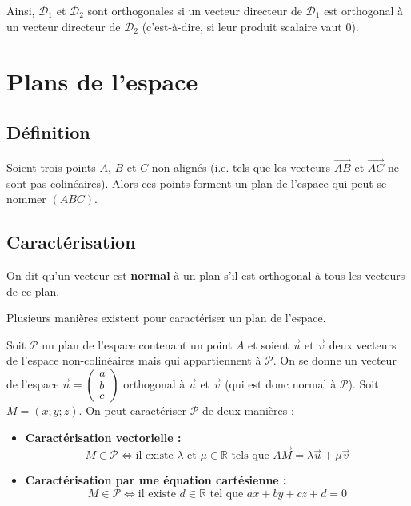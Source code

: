 	\begin{tip}
		Ainsi, $\mathcal{D}_1$ et $\mathcal{D}_2$ sont orthogonales si un vecteur directeur de $\mathcal{D}_1$ est orthogonal à un vecteur directeur de $\mathcal{D}_2$ (c'est-à-dire, si leur produit scalaire vaut $0$).
	\end{tip}

	\section{Plans de l'espace}

	\subsection{Définition}

	Soient trois points $A$, $B$ et $C$ non alignés (i.e. tels que les vecteurs $\overrightarrow{AB}$ et $\overrightarrow{AC}$ ne sont pas colinéaires). Alors ces points forment un plan de l'espace qui peut se nommer $(ABC)$.

	\subsection{Caractérisation}

	\begin{formula}
		On dit qu'un vecteur est \textbf{normal} à un plan s'il est orthogonal à tous les vecteurs de ce plan.
	\end{formula}

	Plusieurs manières existent pour caractériser un plan de l'espace.

	\begin{formula}
		Soit $\mathcal{P}$ un plan de l'espace contenant un point $A$ et soient $\overrightarrow{u}$ et $\overrightarrow{v}$ deux vecteurs de l'espace non-colinéaires mais qui appartiennent à $\mathcal{P}$.
		\newpar
		On se donne un vecteur de l'espace $\overrightarrow{n} = \begin{pmatrix} a \\ b \\ c \end{pmatrix}$ orthogonal à $\overrightarrow{u}$ et $\overrightarrow{v}$ (qui est donc normal à $\mathcal{P}$).
		\newpar
		Soit $M = (x; y; z)$. On peut caractériser $\mathcal{P}$ de deux manières :
		\begin{itemize}
			\item \textbf{Caractérisation vectorielle :}
			\[ M \in \mathcal{P} \iff \text{il existe } \lambda \text{ et } \mu \in \mathbb{R} \text{ tels que } \overrightarrow{AM} = \lambda \overrightarrow{u} + \mu \overrightarrow{v} \]
			\item \textbf{Caractérisation par une équation cartésienne :}
			\newline
			\[ M \in \mathcal{P} \iff \text{il existe } d \in \mathbb{R} \text{ tel que } ax + by + cz + d = 0 \]
		\end{itemize}
	\end{formula}

